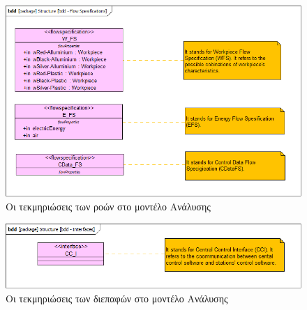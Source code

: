 \documentclass[a4paper,12pt,twoside]{report}
\begin{document}
{\begin{appendices}
			\begin{figure}[hp]
					\centering
					\includegraphics[scale=0.30]{AnalysisModel_bdd-FlowSpesifications.png}
					\caption{Οι τεκμηριώσεις των ροών στο μοντέλο Ανάλυσης}
					\label{φωτ:Οι τεκμηριώσεις των ροών στο μοντέλο Ανάλυσης}
			\end{figure}
			
			\begin{figure}[hp]
					\centering
					\includegraphics[scale=0.30]{AnalysisModel_bdd-Interfaces.png}
					\caption{Οι τεκμηριώσεις των διεπαφών στο μοντέλο Ανάλυσης}
					\label{φωτ:Οι τεκμηριώσεις των διεπαφών στο μοντέλο Ανάλυσης}
			\end{figure}
			

\end{appendices}}
\end{document}
